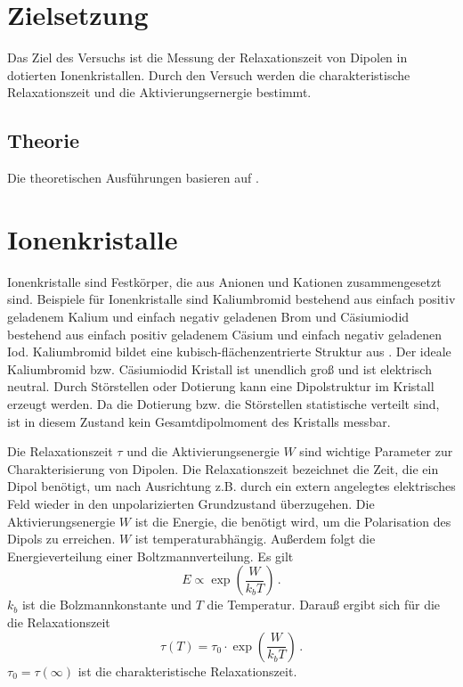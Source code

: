 \section{Zielsetzung}
\label{sec:Zielsetzung}
Das Ziel des Versuchs ist die Messung der Relaxationszeit von Dipolen in dotierten Ionenkristallen. Durch den Versuch werden die charakteristische Relaxationszeit und die Aktivierungsernergie bestimmt. 
\subsection{Theorie}
\label{sec:Theorie}
Die theoretischen Ausführungen basieren auf \cite{Fuller}. 
\section{Ionenkristalle} 
\label{Ionenkristalle} 
Ionenkristalle sind Festkörper, die aus Anionen und Kationen zusammengesetzt sind. Beispiele für Ionenkristalle sind Kaliumbromid bestehend aus einfach positiv geladenem Kalium und einfach negativ geladenen Brom und Cäsiumiodid bestehend aus einfach positiv geladenem Cäsium und einfach negativ geladenen Iod. Kaliumbromid bildet eine kubisch-flächenzentrierte Struktur aus \cite{NaCl_Struktur} \cite{fcc_Struktur}. Der ideale Kaliumbromid bzw. Cäsiumiodid Kristall ist unendlich groß und ist elektrisch neutral. Durch Störstellen oder Dotierung kann eine Dipolstruktur im Kristall erzeugt werden. Da die Dotierung bzw. die Störstellen statistische verteilt sind, ist in diesem Zustand kein Gesamtdipolmoment des Kristalls messbar. 

\label{Relaxationszeit und Aktivierungsenergie}
Die Relaxationszeit $\tau$ und die Aktivierungsenergie $W$ sind wichtige Parameter zur Charakterisierung von Dipolen. Die Relaxationszeit bezeichnet die Zeit, die ein Dipol benötigt, um nach Ausrichtung z.B. durch ein extern angelegtes elektrisches Feld wieder in den unpolarizierten Grundzustand überzugehen. Die Aktivierungsenergie $W$ ist die Energie, die benötigt wird, um die Polarisation des Dipols zu erreichen. $W$ ist temperaturabhängig. Außerdem folgt die Energieverteilung einer Boltzmannverteilung. Es gilt 
\begin{equation}
    E \propto \exp{\left( \frac{W}{k_b T}\right)} \, .
\end{equation}
$k_b$ ist die Bolzmannkonstante und $T$ die Temperatur. Darauß ergibt sich für die die Relaxationszeit 
\begin{equation*}
    \tau(T) = \tau_0 \cdot \exp{\left( \frac{W}{k_b T}\right)} \, .
\end{equation*}
$\tau_0 = \tau(\infty)$ ist die charakteristische Relaxationszeit. 

